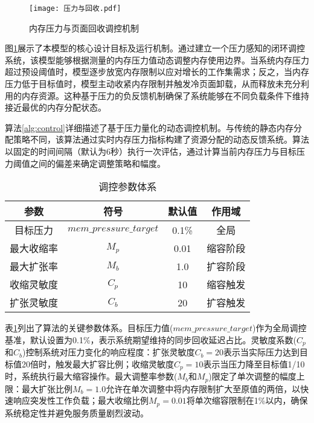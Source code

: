 \begin{figure}[h]
\centering
\texttt{[image: 压力与回收.pdf]}
\caption{内存压力与页面回收调控机制}
\label{fig:pressure_work_set}
\end{figure}

图\ref{fig:pressure_work_set}展示了本模型的核心设计目标及运行机制。通过建立一个压力感知的闭环调控系统，该模型能够根据测量的内存压力值动态调整内存使用边界。当系统内存压力超过预设阈值时，模型逐步放宽内存限制以应对增长的工作集需求；反之，当内存压力低于目标值时，模型主动收紧内存限制并触发冷页面卸载，从而释放未充分利用的内存资源。这种基于压力的负反馈机制确保了系统能够在不同负载条件下维持接近最优的内存分配状态。

算法\ref{alg:control}详细描述了基于压力量化的动态调控机制。与传统的静态内存分配策略不同，该算法通过实时内存压力指标构建了资源分配的动态反馈系统。算法以固定的时间间隔（默认为6秒）执行一次评估，通过计算当前内存压力与目标压力阈值之间的偏差来确定调整策略和幅度。

\begin{table}[H]
\centering
\caption{调控参数体系}
\label{tab:params}
\begin{tabular}{cccc}
\toprule
参数 & 符号 & 默认值 & 作用域 \\
\midrule
目标压力 & \(mem\_pressure\_target\) & 0.1\% & 全局 \\
最大收缩率 & \(M_p\) & 0.01 & 缩容阶段 \\
最大扩张率 & \(M_b\) & 1.0 & 扩容阶段 \\
收缩灵敏度 & \(C_p\) & 10 & 缩容触发 \\
扩张灵敏度 & \(C_b\) & 20 & 扩容触发 \\
\bottomrule
\end{tabular}
\end{table}

表\ref{tab:params}列出了算法的关键参数体系。目标压力值(\(mem\_pressure\_target\))作为全局调控基准，默认设置为0.1\%，表示系统期望维持的同步回收延迟占比。灵敏度系数(\(C_p\)和\(C_b\))控制系统对压力变化的响应程度：扩张灵敏度\(C_b = 20\)表示当实际压力达到目标值20倍时，触发最大扩容比例；收缩灵敏度\(C_p = 10\)表示当压力降至目标值1/10时，系统执行最大缩容操作。最大调整率参数(\(M_b\)和\(M_p\))限定了单次调整的幅度上限：最大扩张比例\(M_b = 1.0\)允许在单次调整中将内存限制扩大至原值的两倍，以快速响应突发性工作负载；最大收缩比例\(M_p = 0.01\)将单次缩容限制在1\%以内，确保系统稳定性并避免服务质量剧烈波动。

